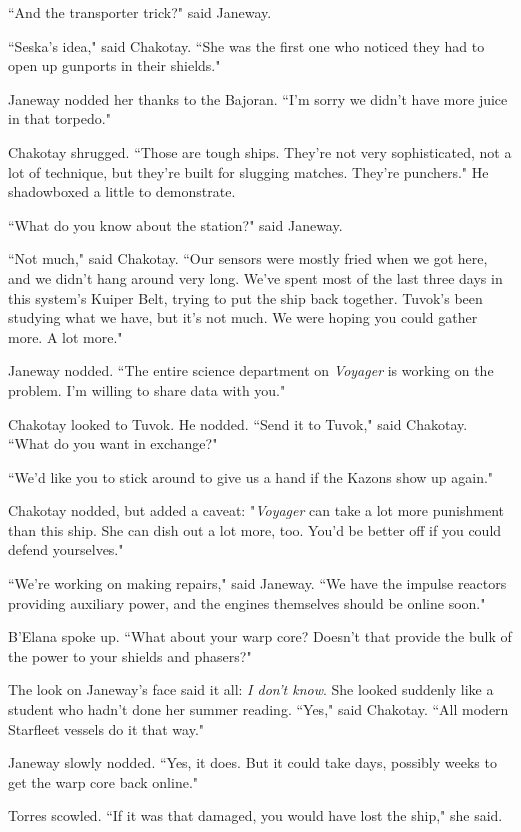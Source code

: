 \documentclass[twoside,letterpaper,12pt]{memoir}
\begin{document}
``And the transporter trick?" said Janeway.

``Seska's idea," said Chakotay. ``She was the first one who noticed they had to open up gunports in their shields."

Janeway nodded her thanks to the Bajoran. ``I'm sorry we didn't have more juice in that torpedo."

Chakotay shrugged. ``Those are tough ships. They're not very sophisticated, not a lot of technique, but they're built for slugging matches. They're punchers." He shadowboxed a little to demonstrate.

``What do you know about the station?" said Janeway.

``Not much," said Chakotay. ``Our sensors were mostly fried when we got here, and we didn't hang around very long. We've spent most of the last three days in this system's Kuiper Belt, trying to put the ship back together. Tuvok's been studying what we have, but it's not much. We were hoping you could gather more. A lot more."

Janeway nodded. ``The entire science department on \textit{Voyager} is working on the problem. I'm willing to share data with you."

Chakotay looked to Tuvok. He nodded. ``Send it to Tuvok," said Chakotay. ``What do you want in exchange?"

``We'd like you to stick around to give us a hand if the Kazons show up again."

Chakotay nodded, but added a caveat: "\textit{Voyager} can take a lot more punishment than this ship. She can dish out a lot more, too. You'd be better off if you could defend yourselves."

``We're working on making repairs," said Janeway. ``We have the impulse reactors providing auxiliary power, and the engines themselves should be online soon."

B'Elana spoke up. ``What about your warp core? Doesn't that provide the bulk of the power to your shields and phasers?"

The look on Janeway's face said it all: \textit{I don't know}. She looked suddenly like a student who hadn't done her summer reading. ``Yes," said Chakotay. ``All modern Starfleet vessels do it that way."

Janeway slowly nodded. ``Yes, it does. But it could take days, possibly weeks to get the warp core back online."

Torres scowled. ``If it was that damaged, you would have lost the ship," she said.
\end{document}
